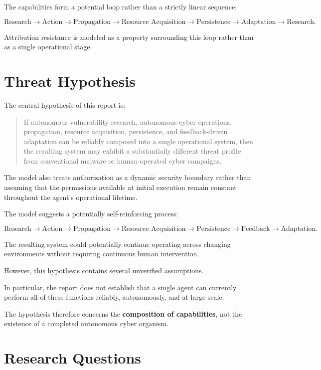 \documentclass[11pt,a4paper]{article}
\begin{document}
The capabilities form a potential loop rather than a strictly linear
sequence:

\[
\text{Research}
\rightarrow
\text{Action}
\rightarrow
\text{Propagation}
\rightarrow
\text{Resource Acquisition}
\rightarrow
\text{Persistence}
\rightarrow
\text{Adaptation}
\rightarrow
\text{Research}.
\]

Attribution resistance is modeled as a property surrounding this loop rather
than as a single operational stage.

\section{Threat Hypothesis}

The central hypothesis of this report is:

\begin{quote}
If autonomous vulnerability research, autonomous cyber operations,
propagation, resource acquisition, persistence, and feedback-driven
adaptation can be reliably composed into a single operational system, then
the resulting system may exhibit a substantially different threat profile from
conventional malware or human-operated cyber campaigns.
\end{quote}

The model also treats authorization as a dynamic security boundary rather
than assuming that the permissions available at initial execution remain
constant throughout the agent's operational lifetime.

The model suggests a potentially self-reinforcing process:

\[
\text{Research}
\rightarrow
\text{Action}
\rightarrow
\text{Propagation}
\rightarrow
\text{Resource Acquisition}
\rightarrow
\text{Persistence}
\rightarrow
\text{Feedback}
\rightarrow
\text{Adaptation}.
\]

The resulting system could potentially continue operating across changing
environments without requiring continuous human intervention.

However, this hypothesis contains several unverified assumptions.

In particular, the report does not establish that a single agent can currently
perform all of these functions reliably, autonomously, and at large scale.

The hypothesis therefore concerns the \textbf{composition of capabilities},
not the existence of a completed autonomous cyber organism.

\section{Research Questions}
\end{document}
